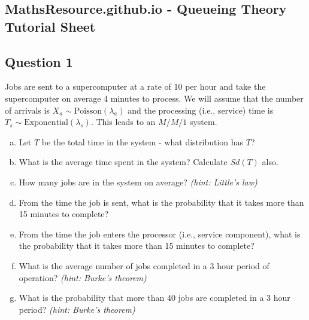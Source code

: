 \documentclass[]{report}
\begin{document}
\subsection*{MathsResource.github.io - Queueing Theory Tutorial Sheet }
\subsection*{Question 1}
Jobs are sent to a supercomputer at a rate of 10 per hour and take the supercomputer on average 4 minutes to process. We will assume that the number of arrivals is $X_a \sim \text{Poisson}(\lambda_a)$ and the processing (i.e., service) time is $T_s \sim \text{Exponential}(\lambda_s)$. This leads to an $M/M/1$ system.\\[-0.2cm]
\begin{enumerate}[(a)]

\item  Let $T$ be the total time in the system - what distribution has $T$?  \item  What is the average time spent in the system? Calculate $Sd(T)$ also.  \item  How many jobs are in the system on average? \textit{(hint: Little's law)}   \item  From the time the job is sent, what is the probability that it takes more than 15 minutes to complete?   \item  From the time the job enters the processor (i.e., service component), what is the probability that it takes more than 15 minutes to complete?  \item  What is the average number of jobs completed in a 3 hour period of operation? \textit{(hint: Burke's theorem)}  \item  What is the probability that more than 40 jobs are completed in a 3 hour period? \textit{(hint: Burke's theorem)}
\end{enumerate}
\end{document}

